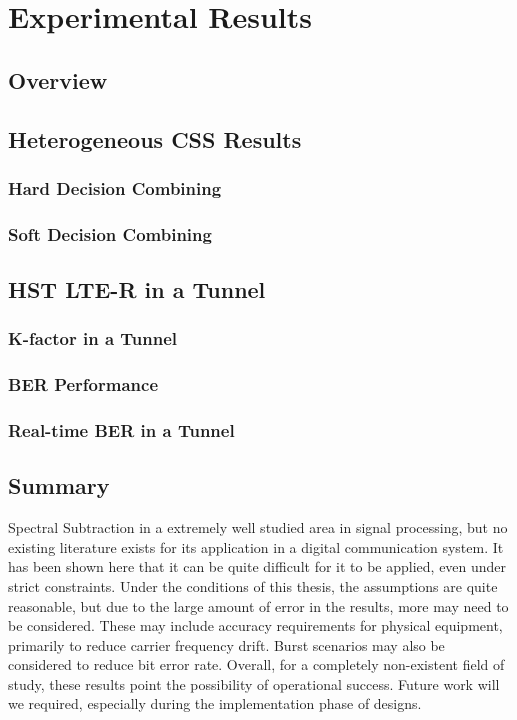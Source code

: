 \chapter{Experimental Results}
\label{chapter6}

\section{Overview} 

\section{Heterogeneous CSS Results}
\subsection{Hard Decision Combining}
\subsection{Soft Decision Combining}

\section{HST LTE-R in a Tunnel}
\subsection{K-factor in a Tunnel}
\subsection{BER Performance}
\subsection{Real-time BER in a Tunnel}

\section{Summary}

Spectral Subtraction in a extremely well studied area in signal processing, but no existing literature exists for its application in a digital communication system.  It has been shown here that it can be quite difficult for it to be applied, even under strict constraints.  Under the conditions of this thesis, the assumptions are quite reasonable, but due to the large amount of error in the results, more may need to be considered.  These may include accuracy requirements for physical equipment, primarily to reduce carrier frequency drift.  Burst scenarios may also be considered to reduce bit error rate.  Overall, for a completely non-existent field of study, these results point the possibility of operational success.  Future work will we required, especially during the implementation phase of designs.\\



